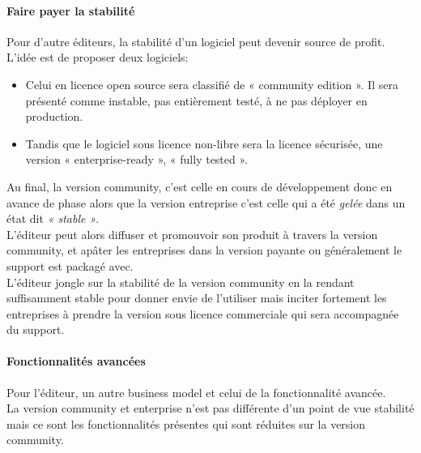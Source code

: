 				\paragraph{Faire payer la stabilité\\}

					Pour d'autre éditeurs, la stabilité d'un logiciel peut devenir source de profit. L'idée est de proposer deux logiciels:\\

					\begin{itemize}[label=\textbullet, font=\LARGE \color{burntorange}]
						\item Celui en licence open source sera classifié de « community edition ». Il sera présenté comme instable, pas entièrement testé, à ne pas déployer en production.
						\item Tandis que le logiciel sous licence non-libre sera la licence sécurisée, une version « enterprise-ready », « fully tested ».
					\end{itemize} 

					Au final, la version community, c'est celle en cours de développement donc en avance de phase alors que la version entreprise c'est celle qui a été \textit{gelée} dans un état dit \textit{« stable »}.\\

					L'éditeur peut alors diffuser et promouvoir son produit à travers la version community, et apâter les entreprises dans la version payante ou généralement le support est packagé avec.\\

					L'éditeur jongle sur la stabilité de la version community en la rendant suffisamment stable pour donner envie de l'utiliser mais inciter fortement les entreprises à prendre la version sous licence commerciale qui sera accompagnée du support.

				\paragraph{Fonctionnalités avancées\\}

					Pour l'éditeur, un autre business model et celui de la fonctionnalité avancée.\\
					La version community et enterprise n'est pas différente d'un point de vue stabilité mais ce sont les fonctionnalités présentes qui sont réduites sur la version community.\\

